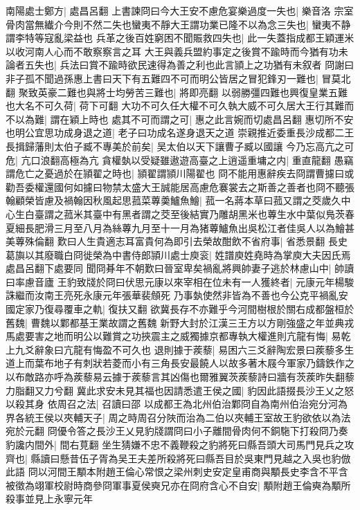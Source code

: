 南陽處士鄭方|{
	處昌呂翻}
上書諫冏曰今大王安不慮危宴樂過度一失也|{
	樂音洛}
宗室骨肉當無纎介今則不然二失也蠻夷不靜大王謂功業已隆不以為念三失也|{
	蠻夷不静謂李特等寇亂梁益也}
兵革之後百姓窮困不聞賑救四失也|{
	此一失蓋指成都王穎運米以收河南人心而不敢察察言之耳}
大王與義兵盟約事定之後賞不踰時而今猶有功未論者五失也|{
	兵法曰賞不踰時欲民速得為善之利也此言頴上之功猶有未叙者}
冏謝曰非子孤不聞過孫惠上書曰天下有五難四不可而明公皆居之冒犯鋒刃一難也|{
	冒莫北翻}
聚致英豪二難也與將士均勞苦三難也|{
	將即亮翻}
以弱勝彊四難也興復皇業五難也大名不可久荷|{
	荷下可翻}
大功不可久任大權不可久執大威不可久居大王行其難而不以為難|{
	謂在穎上時也}
處其不可而謂之可|{
	惠之此言婉而切處昌呂翻}
惠切所不安也明公宜思功成身退之道|{
	老子曰功成名遂身退天之道}
崇親推近委重長沙成都二王長揖歸藩則太伯子臧不專美於前矣|{
	吴太伯以天下讓曹子臧以國讓}
今乃忘高亢之可危|{
	亢口浪翻高極為亢}
貪權埶以受疑雖遨遊高臺之上逍遥重墉之内|{
	重直龍翻}
愚竊謂危亡之憂過於在頴翟之時也|{
	頴翟謂頴川陽翟也}
冏不能用惠辭疾去冏謂曹攄曰或勸吾委權還國何如攄曰物禁太盛大王誠能居高慮危褰裳去之斯善之善者也冏不聽張翰顧榮皆慮及禍翰因秋風起思菰菜蓴羮鱸魚鱠|{
	菰一名蔣本草曰菰又謂之茭歲久中心生白臺謂之菰米其臺中有黑者謂之茭至後結實乃雕胡黑米也蓴生水中葉似鳬茨春夏細長肥滑三月至八月為絲蓴九月至十一月為猪蓴鱸魚出吳松江者佳吳人以為鱠甚美蓴殊倫翻}
歎曰人生貴適志耳富貴何為即引去榮故酣飲不省府事|{
	省悉景翻}
長史葛旟以其廢職白冏徙榮為中書侍郎頴川處士庾衮|{
	姓譜庾姓堯時為掌庾大夫因氏焉處昌呂翻下處要同}
聞冏朞年不朝歎曰晉室卑矣禍亂將興帥妻子逃於林慮山中|{
	帥讀曰率慮音廬}
王豹致牋於冏曰伏思元康以來宰相在位未有一人獲終者|{
	元康元年楊駿誅繼而汝南王亮死永康元年張華裴頠死}
乃事埶使然非皆為不善也今公克平禍亂安國定家乃復尋覆車之軌|{
	復扶又翻}
欲冀長存不亦難乎今河間樹根於關右成都盤桓於舊魏|{
	曹魏以鄴都基王業故謂之舊魏}
新野大封於江漢三王方以方剛強盛之年並典戎馬處要害之地而明公以難賞之功挾震主之威獨據京都專執大權進則亢龍有悔|{
	易乾上九爻辭象曰亢龍有悔盈不可久也}
退則據于蒺藜|{
	易困六三爻辭陶宏景曰蒺藜多生道上而葉布地子有刺狀若菱而小有三角長安最饒人以故多著木屐今軍家乃鑄鉄作之以布敵路亦呼為蒺藜易云據于蒺藜言其凶傷也爾雅翼茨蒺藜詩曰牆有茨蒺昨失翻藜力脂翻又力兮翻}
冀此求安未見其福也因請悉遣王侯之國|{
	豹因此語掇長沙王乂之怒以殺其身}
依周召之法|{
	召讀曰邵}
以成都王為北州伯治鄴冏自為南州伯治宛分河為界各統王侯以夾輔天子|{
	周之時周召分陜而治為二伯以夾輔王室故王豹欲依以為法宛於元翻}
冏優令答之長沙王乂見豹牋謂冏曰小子離間骨肉何不銅駞下打殺冏乃奏豹讒内間外|{
	間右莧翻}
坐生猜嫌不忠不義鞭殺之豹將死曰縣吾頭大司馬門見兵之攻齊也|{
	縣讀曰懸昔伍子胥為吴王夫差所殺將死曰縣吾目於吳東門見越之入吳也豹倣此語}
冏以河間王顒本附趙王倫心常恨之梁州刺史安定皇甫商與顒長史李含不平含被徵為翊軍校尉時商參冏軍事夏侯奭兄亦在冏府含心不自安|{
	顒附趙王倫奭為顒所殺事並見上永寧元年}
